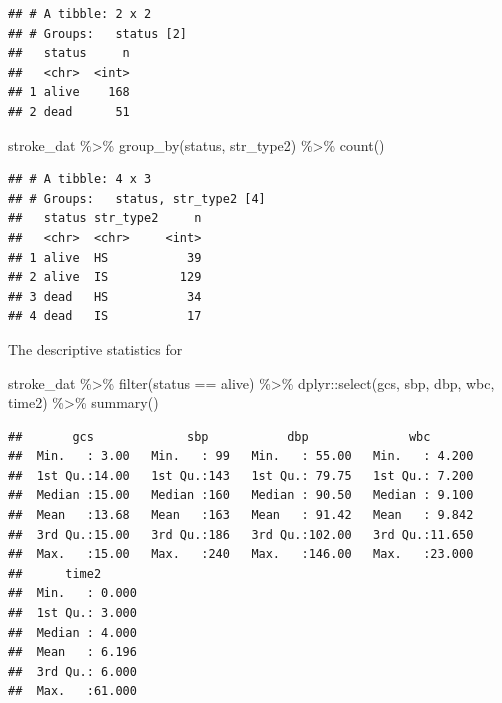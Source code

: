 \documentclass[
]{book}
\makeatletter
\newenvironment{Shaded}{\begin{snugshade}}{\end{snugshade}}
\newcommand{\FunctionTok}[1]{\textcolor[rgb]{0,0,0}{#1}}
\newcommand{\NormalTok}[1]{#1}
\newcommand{\SpecialCharTok}[1]{\textcolor[rgb]{0,0,0}{#1}}
\newcommand{\StringTok}[1]{\textcolor[rgb]{0.5,0.5,0.5}{#1}}
\newenvironment{kframe}{%
\medskip{}
\setlength{\fboxsep}{.8em}
 \def\at@end@of@kframe{}%
 \ifinner\ifhmode%
  \def\at@end@of@kframe{\end{minipage}}%
  \begin{minipage}{\columnwidth}%
 \fi\fi%
 \def\FrameCommand##1{\hskip\@totalleftmargin \hskip-\fboxsep
 \colorbox{shadecolor}{##1}\hskip-\fboxsep
     \hskip-\linewidth \hskip-\@totalleftmargin \hskip\columnwidth}%
 \MakeFramed {\advance\hsize-\width
   \@totalleftmargin\z@ \linewidth\hsize
   \@setminipage}}%
 {\par\unskip\endMakeFramed%
 \at@end@of@kframe}
\renewenvironment{Shaded}{\begin{kframe}}{\end{kframe}}
\makeatother
\begin{document}
\begin{verbatim}
## # A tibble: 2 x 2
## # Groups:   status [2]
##   status     n
##   <chr>  <int>
## 1 alive    168
## 2 dead      51
\end{verbatim}

\begin{Shaded}
\begin{Highlighting}[]
\NormalTok{stroke\_dat }\SpecialCharTok{\%\textgreater{}\%} \FunctionTok{group\_by}\NormalTok{(status, str\_type2) }\SpecialCharTok{\%\textgreater{}\%} \FunctionTok{count}\NormalTok{()}
\end{Highlighting}
\end{Shaded}

\begin{verbatim}
## # A tibble: 4 x 3
## # Groups:   status, str_type2 [4]
##   status str_type2     n
##   <chr>  <chr>     <int>
## 1 alive  HS           39
## 2 alive  IS          129
## 3 dead   HS           34
## 4 dead   IS           17
\end{verbatim}

The descriptive statistics for

\begin{Shaded}
\begin{Highlighting}[]
\NormalTok{stroke\_dat }\SpecialCharTok{\%\textgreater{}\%} \FunctionTok{filter}\NormalTok{(status }\SpecialCharTok{==} \StringTok{\textquotesingle{}alive\textquotesingle{}}\NormalTok{) }\SpecialCharTok{\%\textgreater{}\%} 
\NormalTok{  dplyr}\SpecialCharTok{::}\FunctionTok{select}\NormalTok{(gcs, sbp, dbp, wbc, time2) }\SpecialCharTok{\%\textgreater{}\%} 
  \FunctionTok{summary}\NormalTok{()}
\end{Highlighting}
\end{Shaded}

\begin{verbatim}
##       gcs             sbp           dbp              wbc        
##  Min.   : 3.00   Min.   : 99   Min.   : 55.00   Min.   : 4.200  
##  1st Qu.:14.00   1st Qu.:143   1st Qu.: 79.75   1st Qu.: 7.200  
##  Median :15.00   Median :160   Median : 90.50   Median : 9.100  
##  Mean   :13.68   Mean   :163   Mean   : 91.42   Mean   : 9.842  
##  3rd Qu.:15.00   3rd Qu.:186   3rd Qu.:102.00   3rd Qu.:11.650  
##  Max.   :15.00   Max.   :240   Max.   :146.00   Max.   :23.000  
##      time2       
##  Min.   : 0.000  
##  1st Qu.: 3.000  
##  Median : 4.000  
##  Mean   : 6.196  
##  3rd Qu.: 6.000  
##  Max.   :61.000
\end{verbatim}
\end{document}

